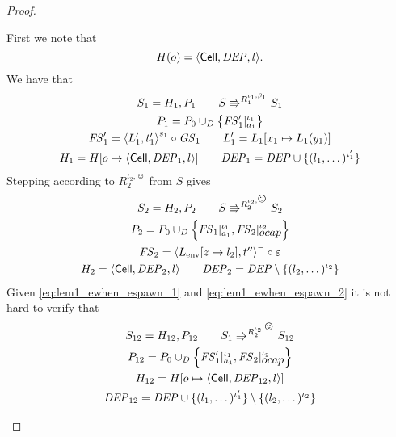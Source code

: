 \begin{proof}
\begin{description}
      First we note that
      \begin{equation}
        H(o) = \mbox{$\langle \mbox{$\mathsf{Cell}$}{}, \mathit{DEP}, l \rangle$}.
      \end{equation}
      We have that 
      \begin{equation} \label{eq:lem1_ewhen_espawn_1}
        \begin{gathered}    
          S_1 = H_1, P_1 \quad\quad S \Rrightarrow^{R_1^{\iota_1, \beta_1}} S_1
          \\
          P_1 = P_0 \cup_D \left\{ \mathit{FS}'_1|_{a_1}^{\iota_1} \right\} \\
          \mathit{FS}'_1 = \mbox{$\langle L'_1, t'_1 \rangle$}^{s_1} \circ \mathit{GS}_1  \quad\quad L'_1 = L_1[x_1 \mapsto
          L_1(y_1)] \\
          H_1 = H[o \mapsto \mbox{$\langle \mbox{$\mathsf{Cell}$}{}, \mathit{DEP}_1, l \rangle$}] \quad\quad \mathit{DEP}_1 = \mathit{DEP} \cup \{ (l_1,
          \dots)^{\iota'_1} \}
        \end{gathered}
      \end{equation}
      Stepping according to $R_2^{\iota_2, \smiley}$ from $S$ gives
      \begin{equation} \label{eq:lem1_ewhen_espawn_2}
        \begin{gathered}
          S_2 = H_2, P_2 \andalso S \Rrightarrow^{R_2^{\iota_2, \smiley}} S_2
          \\
          P_2 = P_0 \cup_D \left\{ \FS_1|_{a_1}^{\iota_1},
          \FS_2|_{\ocap}^{\iota_2} \right\} \\
          \FS_2 = \xframe{L_{\text{env}}[z \mapsto l_2], t''}^{-} \circ
          \varepsilon \\
          H_2 = \Cell{\DEP_2, l} \andalso \DEP_2 = \DEP \setminus \{ (l_2,
          \dots)^{\iota_2} \}
        \end{gathered}
      \end{equation}
      Given \eqref{eq:lem1_ewhen_espawn_1} and \eqref{eq:lem1_ewhen_espawn_2} it
      is not hard to verify that
      \begin{equation} 
        \begin{gathered}
          S_{12} = H_{12}, P_{12} \andalso S_1 \Rrightarrow^{R_2^{\iota_2,
          \smiley}} S_{12}
          \\
          P_{12} = P_0 \cup_D \left\{ \FS'_1|_{a_1}^{\iota_1},
          \FS_2|_{\ocap}^{\iota_2} \right\} \\
          H_{12} = H[o \mapsto \Cell{\DEP_{12}, l}] \\ 
          \DEP_{12} = \DEP \cup \{ (l_1, \dots)^{\iota'_1} \} \setminus \{ (l_2,
          \dots)^{\iota_2} \}

\end{gathered}
\end{equation}
\end{description}
\end{proof}
